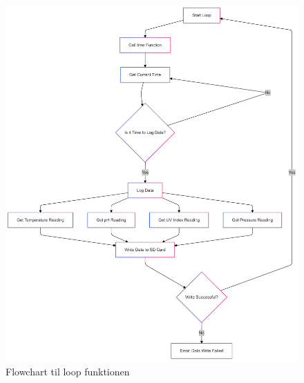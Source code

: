 		\begin{figure}[!h]
			\centering
			\includegraphics[width=\textwidth]{Figures/Flowchart loop.png}
			\caption{Flowchart til loop funktionen}
		\end{figure}
		
	\clearpage
	\newpage
